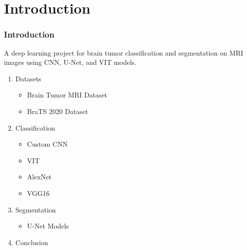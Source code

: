 \documentclass[../presentation.tex]{subfiles} %
\begin{document}
\section{Introduction} %

\begin{frame}

	\frametitle{Introduction}

	\begin{center}
  A deep learning project for brain tumor classification and segmentation on MRI images using CNN, U-Net, and VIT models.
	\end{center}

	\begin{enumerate}
		\item Datasets
			\begin{itemize}
				\item Brain Tumor MRI Dataset 
				\item BraTS 2020 Dataset 
			\end{itemize}
		\item Classification
			\begin{itemize}
				\item Custom CNN
				\item VIT
				\item AlexNet
				\item VGG16
			\end{itemize}
		\item Segmentation
			\begin{itemize}
				\item U-Net Models
			\end{itemize}
		\item Conclusion
	\end{enumerate}

\end{frame}
\end{document}
